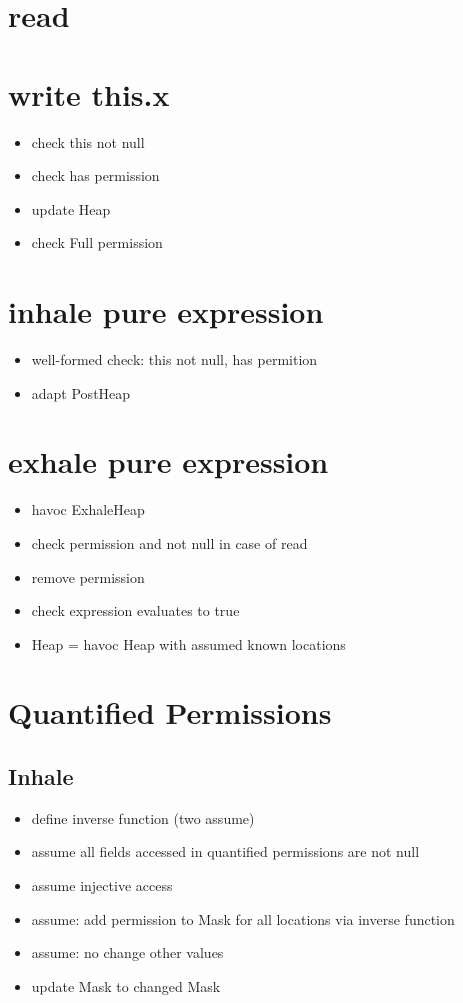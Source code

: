 \documentclass[12pt]{article}
\begin{document}
\maketitle

\section{read}

\section{write this.x}
\begin{itemize}
\item check this not null
\item check has permission
\item update Heap
\item check Full permission
\end{itemize}

\section{inhale pure expression}
\begin{itemize}
\item well-formed check: this not null, has permition
\item adapt PostHeap
\end{itemize}

\section{exhale pure expression}
\begin{itemize}
\item havoc ExhaleHeap
\item check permission and not null in case of read
\item remove permission
\item check expression evaluates to true
\item Heap = havoc Heap with assumed known locations
\end{itemize}

\section{Quantified Permissions}
\subsection{Inhale}
\begin{itemize}
\item define inverse function (two assume)
\item assume all fields accessed in quantified permissions are not null
\item assume injective access
\item assume: add permission to Mask for all locations via inverse function
\item assume: no change other values
\item update Mask to changed Mask
\end{itemize}
\end{document}
